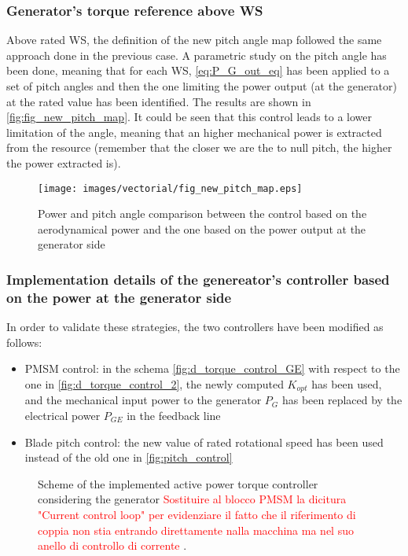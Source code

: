 \subsubsection{Generator's torque reference above WS}
Above rated WS, the definition of the new pitch angle map followed the same approach done in the previous case. A parametric study on the pitch angle has been done, meaning that for each WS, \autoref{eq:P_G_out_eq} has been applied to a set of pitch angles and then the one limiting the power output (at the generator) at the rated value has been identified. The results are shown in \autoref{fig:fig_new_pitch_map}. It could be seen that this control leads to a lower limitation of the angle, meaning that an higher mechanical power is extracted from the resource (remember that the closer we are the to null pitch, the higher the power extracted is).
\begin{figure}[htb]
  \centering
  \texttt{[image: images/vectorial/fig\_new\_pitch\_map.eps]}
  \caption{Power and pitch angle comparison between the control based on the aerodynamical power and the one based on the power output at the generator side}
  \label{fig:fig_new_pitch_map}
\end{figure}

\subsubsection{Implementation details of the genereator's controller based on the power at the generator side}
In order to validate these strategies, the two controllers have been modified as follows:
\begin{itemize}
  \item PMSM control: in the schema \autoref{fig:d_torque_control_GE} with respect to the one in \autoref{fig:d_torque_control_2}, the newly computed  $K_{opt}$ has been used, and the mechanical input power to the generator $P_G$ has been replaced by the electrical power $P_{GE}$ in the feedback line
  \item Blade pitch control: the new value of rated rotational speed has been used instead of the old one in \autoref{fig:pitch_control}
\end{itemize}

\begin{figure}[htb]
  \centering
  
  \caption{Scheme of the implemented active power torque controller considering the generator \textcolor{red}{Sostituire al blocco PMSM la dicitura "Current control loop" per evidenziare il fatto che il riferimento di coppia non stia entrando direttamente nalla macchina ma nel suo anello di controllo di corrente }.}
  \label{fig:d_torque_control_GE}
\end{figure}

